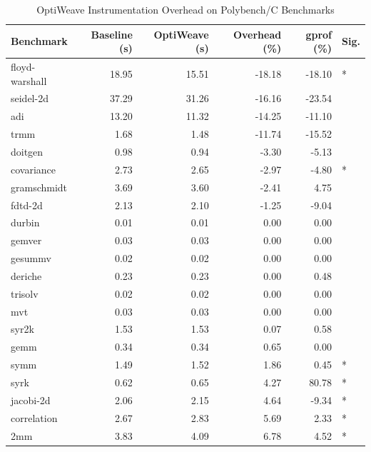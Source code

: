 \begin{table}[h]
\centering
\caption{OptiWeave Instrumentation Overhead on Polybench/C Benchmarks}
\label{tab:rq1-overhead-full}
\begin{tabular}{lrrrrl}
\toprule
\textbf{Benchmark} & \textbf{Baseline (s)} & \textbf{OptiWeave (s)} & \textbf{Overhead (\%)} & \textbf{gprof (\%)} & \textbf{Sig.} \\
\midrule
floyd-warshall       &  18.95 &  15.51 & -18.18 & -18.10 & * \\
seidel-2d            &  37.29 &  31.26 & -16.16 & -23.54 &   \\
adi                  &  13.20 &  11.32 & -14.25 & -11.10 &   \\
trmm                 &   1.68 &   1.48 & -11.74 & -15.52 &   \\
doitgen              &   0.98 &   0.94 &  -3.30 &  -5.13 &   \\
covariance           &   2.73 &   2.65 &  -2.97 &  -4.80 & * \\
gramschmidt          &   3.69 &   3.60 &  -2.41 &   4.75 &   \\
fdtd-2d              &   2.13 &   2.10 &  -1.25 &  -9.04 &   \\
durbin               &   0.01 &   0.01 &   0.00 &   0.00 &   \\
gemver               &   0.03 &   0.03 &   0.00 &   0.00 &   \\
gesummv              &   0.02 &   0.02 &   0.00 &   0.00 &   \\
deriche              &   0.23 &   0.23 &   0.00 &   0.48 &   \\
trisolv              &   0.02 &   0.02 &   0.00 &   0.00 &   \\
mvt                  &   0.03 &   0.03 &   0.00 &   0.00 &   \\
syr2k                &   1.53 &   1.53 &   0.07 &   0.58 &   \\
gemm                 &   0.34 &   0.34 &   0.65 &   0.00 &   \\
symm                 &   1.49 &   1.52 &   1.86 &   0.45 & * \\
syrk                 &   0.62 &   0.65 &   4.27 &  80.78 & * \\
jacobi-2d            &   2.06 &   2.15 &   4.64 &  -9.34 & * \\
correlation          &   2.67 &   2.83 &   5.69 &   2.33 & * \\
2mm                  &   3.83 &   4.09 &   6.78 &   4.52 & * \\

\end{tabular}
\end{table}
